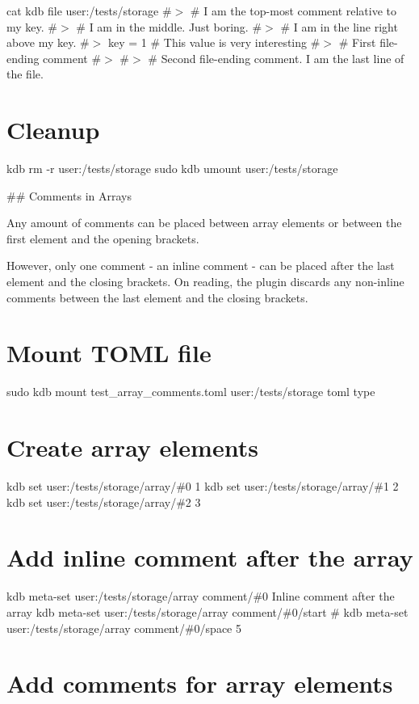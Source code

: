 cat {\ttfamily kdb file user\+:/tests/storage} \#$>$ \# I am the top-\/most comment relative to my key. \#$>$ \# I am in the middle. Just boring. \#$>$ \# I am in the line right above my key. \#$>$ key = 1 \# This value is very interesting \#$>$ \# First file-\/ending comment \#$>$ \#$>$ \# Second file-\/ending comment. I am the last line of the file.\hypertarget{autotoc_md635_autotoc_md726}{}\section{Cleanup}\label{autotoc_md635_autotoc_md726}
kdb rm -\/r user\+:/tests/storage sudo kdb umount user\+:/tests/storage 
\begin{DoxyCode}
## Comments in Arrays

Any amount of comments can be placed between array elements or between the first element and the opening
       brackets.

However, only one comment - an inline comment - can be placed after the last element and the closing
       brackets.
On reading, the plugin discards any non-inline comments between the last element and the closing brackets.
\end{DoxyCode}
 \hypertarget{autotoc_md635_autotoc_md727}{}\section{Mount T\+O\+M\+L file}\label{autotoc_md635_autotoc_md727}
sudo kdb mount test\+\_\+array\+\_\+comments.\+toml user\+:/tests/storage toml type\hypertarget{autotoc_md635_autotoc_md728}{}\section{Create array elements}\label{autotoc_md635_autotoc_md728}
kdb set \textquotesingle{}user\+:/tests/storage/array/\#0\textquotesingle{} \textquotesingle{}1\textquotesingle{} kdb set \textquotesingle{}user\+:/tests/storage/array/\#1\textquotesingle{} \textquotesingle{}2\textquotesingle{} kdb set \textquotesingle{}user\+:/tests/storage/array/\#2\textquotesingle{} \textquotesingle{}3\textquotesingle{}\hypertarget{autotoc_md635_autotoc_md729}{}\section{Add inline comment after the array}\label{autotoc_md635_autotoc_md729}
kdb meta-\/set \textquotesingle{}user\+:/tests/storage/array\textquotesingle{} \textquotesingle{}comment/\#0\textquotesingle{} \textquotesingle{} Inline comment after the array\textquotesingle{} kdb meta-\/set \textquotesingle{}user\+:/tests/storage/array\textquotesingle{} \textquotesingle{}comment/\#0/start\textquotesingle{} \textquotesingle{}\#\textquotesingle{} kdb meta-\/set \textquotesingle{}user\+:/tests/storage/array\textquotesingle{} \textquotesingle{}comment/\#0/space\textquotesingle{} \textquotesingle{}5\textquotesingle{}\hypertarget{autotoc_md635_autotoc_md730}{}\section{Add comments for array elements}\label{autotoc_md635_autotoc_md730}
